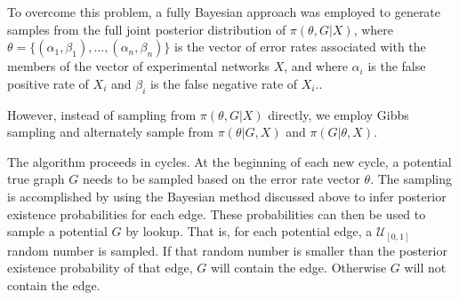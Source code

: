 \documentclass{bioinfo}
\newcommand{\note}[1]{{\color{red}[#1]}}
\begin{document}
\begin{methods}
To overcome this problem, a fully Bayesian approach was employed to generate samples from the full joint posterior distribution of $\pi(\theta,G|X)$, where $\theta = \{ (\alpha_1,\beta_1), \ldots , (\alpha_n,\beta_n) \}$ is the vector of error rates associated with the members of the vector of experimental networks $X$, and where $\alpha_i$ is the false positive rate of $X_i$ and $\beta_i$ is the false negative rate of $X_i$..


However, instead of sampling from $\pi(\theta,G|X)$ directly, we employ Gibbs sampling \citep{hastings_monte_1970} and alternately sample from $\pi(\theta|G,X)$ and $\pi(G|\theta,X)$.

The algorithm proceeds in cycles. At the beginning of each new cycle, a potential true graph $G$ needs to be sampled based on the error rate vector $\theta$. The sampling is accomplished by using the Bayesian method discussed above to infer posterior existence probabilities for each edge. These probabilities can then be used to sample a potential $G$ by lookup. That is, for each potential edge, a $\mathcal{U}_{[0,1]}$ random number is sampled. If that random number is smaller than the posterior existence probability of that edge, $G$ will contain the edge. Otherwise $G$ will not contain the edge.


\end{methods}
\end{document}
